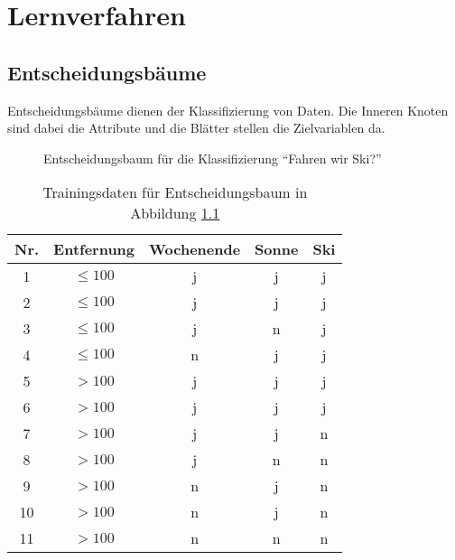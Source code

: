 \chapter{Lernverfahren}
\section{Entscheidungsbäume}
Entscheidungsbäume dienen der Klassifizierung von Daten.
Die Inneren Knoten sind dabei die Attribute und die Blätter stellen die Zielvariablen da.
\begin{figure}[htbp]
	\centering
	\caption{Entscheidungsbaum für die Klassifizierung ``Fahren wir Ski?''}
	\label{fig:EntscheidungsbaumBsp}
\end{figure}
\begin{table}[htbp]
	\centering
	\begin{tabular}{ccccc}
		\toprule
		\textbf{Nr.} & \textbf{Entfernung} & \textbf{Wochenende} & \textbf{Sonne} & \textbf{Ski}	\\
		\midrule
		1 & \(\leq 100\) & j & j & j\\
		2 & \(\leq 100\) & j & j & j\\
		3 & \(\leq 100\) & j & n & j\\
		4 & \(\leq 100\) & n & j & j\\
		5 & \(>100\) & j & j & j\\
		6 & \(>100\) & j & j & j\\
		7 & \(>100\) & j & j & n\\
		8 & \(>100\) & j & n & n\\
		9 & \(>100\) & n & j & n\\
		10 & \(>100\) & n & j & n\\
		11 & \(>100\) & n & n & n	\\
		\bottomrule
	\end{tabular}
	\caption{Trainingsdaten für Entscheidungsbaum in Abbildung \ref{fig:EntscheidungsbaumBsp}}
\end{table}


